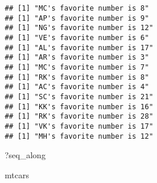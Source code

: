 \documentclass[
]{article}
\newenvironment{Shaded}{\begin{snugshade}}{\end{snugshade}}
\newcommand{\NormalTok}[1]{#1}
\begin{document}
\begin{verbatim}
## [1] "MC's favorite number is 8"
## [1] "AP's favorite number is 9"
## [1] "NG's favorite number is 12"
## [1] "VE's favorite number is 6"
## [1] "AL's favorite number is 17"
## [1] "AR's favorite number is 3"
## [1] "MC's favorite number is 7"
## [1] "RK's favorite number is 8"
## [1] "AC's favorite number is 4"
## [1] "SC's favorite number is 21"
## [1] "KK's favorite number is 16"
## [1] "RK's favorite number is 28"
## [1] "VK's favorite number is 17"
## [1] "MH's favorite number is 12"
\end{verbatim}

\begin{Shaded}
\begin{Highlighting}[]
\NormalTok{?seq\_along}
\end{Highlighting}
\end{Shaded}

\begin{Shaded}
\begin{Highlighting}[]
\NormalTok{mtcars}
\end{Highlighting}
\end{Shaded}
\end{document}
